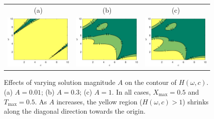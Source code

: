 \documentclass[a4paper,11pt]{article}
\begin{document}
\begin{figure}
\centering
\begin{tabular}{ccc}
(a)&(b)&(c)\\
\includegraphics[width=2in]{Figures/MIPcontour7.eps}&
\includegraphics[width=2in]{Figures/MIPcontour8.eps}&
\includegraphics[width=2in]{Figures/MIPcontour9.eps}
\end{tabular}
\caption{Effects of varying solution magnitude $A$ on the contour of $H(\omega,c)$. (a) $A=0.01$; (b) $A=0.3$; (c) $A=1$.  In all cases, $X_{\max}=0.5$ and $T_{\max}=0.5$. As $A$ increases, the yellow region ($H(\omega,c)>1$) shrinks along the diagonal direction towards the origin.}\label{fig.MIPtest3}
\end{figure}
\end{document}
